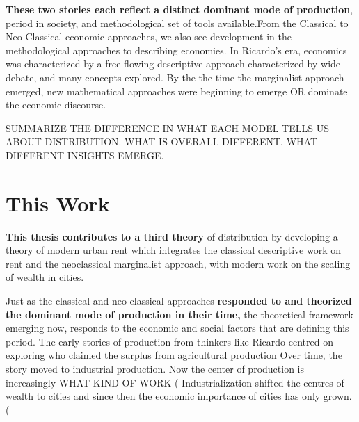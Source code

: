 
\textbf{These two stories each reflect a distinct dominant mode of production}, period in society, and methodological set of tools available.From the Classical to Neo-Classical economic approaches, we also see development in the methodological approaches to describing economies. In Ricardo's era, economics was characterized by a free flowing descriptive approach characterized by wide debate, and many concepts explored. By the the time the marginalist approach emerged, new mathematical approaches were beginning to emerge OR dominate the economic discourse. 

SUMMARIZE THE DIFFERENCE IN WHAT EACH MODEL TELLS US ABOUT DISTRIBUTION. WHAT IS OVERALL DIFFERENT, WHAT DIFFERENT INSIGHTS EMERGE. 

\section{This Work}

\textbf{This thesis contributes to a third theory} %
of distribution by developing a theory of modern urban rent which integrates the classical descriptive work on rent and the neoclassical marginalist approach, with modern work on the scaling of wealth in cities. 

Just as the classical and neo-classical approaches \textbf{responded to and theorized the dominant mode of production in their time,} the theoretical framework emerging now, responds to the economic and social factors that are defining this period.  The early stories of production from thinkers like Ricardo centred on exploring who claimed the surplus from agricultural production Over time, the story moved to industrial production. Now the center of production is increasingly  WHAT KIND OF WORK (%
Industrialization shifted the centres of wealth to cities and since then the economic importance of cities has only grown. (%

